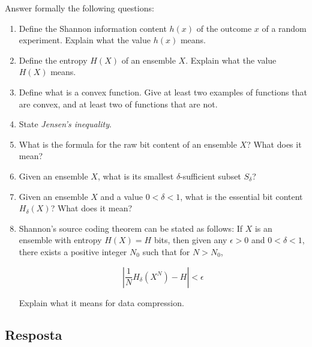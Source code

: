 Answer formally the following questions:

\begin{enumerate}
    \item Define the Shannon information content $h(x)$ of the outcome $x$ of a random experiment. Explain what the value $h(x)$ means.
    \item Define the entropy $H(X)$ of an ensemble $X$. Explain what the value $H(X)$ means.
    \item Define what is a convex function. Give at least two examples of functions that are convex, and at least two of functions that are not.
    \item State \textit{Jensen's inequality}.
    \item What is the formula for the raw bit content of an ensemble $X$? What does it mean?
    \item Given an ensemble $X$, what is its smallest $\delta$-sufficient subset $S_{\delta}$?
    \item Given an ensemble $X$ and a value $0 < \delta < 1$, what is the essential bit content $H_{\delta}(X)$? What does it mean?
    \item Shannon's source coding theorem can be stated as follows: If $X$ is an ensemble with entropy $H(X) = H$ bits, then given any $\epsilon > 0$ and $0 < \delta < 1$, there exists a positive integer $N_0$ such that for $N > N_0$,
    
    \[\left| {\frac{1}{N}{H_\delta }\left( {{X^N}} \right) - H} \right| < \epsilon\]
    
    Explain what it means for data compression.
\end{enumerate}

\subsection*{Resposta}

